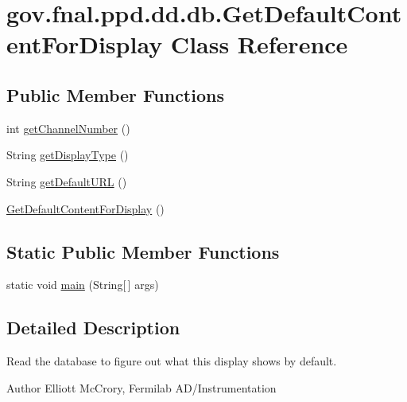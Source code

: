 \hypertarget{classgov_1_1fnal_1_1ppd_1_1dd_1_1db_1_1GetDefaultContentForDisplay}{\section{gov.\-fnal.\-ppd.\-dd.\-db.\-Get\-Default\-Content\-For\-Display Class Reference}
\label{classgov_1_1fnal_1_1ppd_1_1dd_1_1db_1_1GetDefaultContentForDisplay}
}
\subsection*{Public Member Functions}
\begin{DoxyCompactItemize}
\item 
int \hyperlink{classgov_1_1fnal_1_1ppd_1_1dd_1_1db_1_1GetDefaultContentForDisplay_a91c8a3eed831fa3bb4ad275d69b4ba02}{get\-Channel\-Number} ()
\item 
String \hyperlink{classgov_1_1fnal_1_1ppd_1_1dd_1_1db_1_1GetDefaultContentForDisplay_a4a29571d02723ece4c261d02f49c6624}{get\-Display\-Type} ()
\item 
String \hyperlink{classgov_1_1fnal_1_1ppd_1_1dd_1_1db_1_1GetDefaultContentForDisplay_a6bf210300f913dad893697e363b10943}{get\-Default\-U\-R\-L} ()
\item 
\hyperlink{classgov_1_1fnal_1_1ppd_1_1dd_1_1db_1_1GetDefaultContentForDisplay_ac29f1d17bc0b8de2def1a7dfb77ee9c9}{Get\-Default\-Content\-For\-Display} ()
\end{DoxyCompactItemize}
\subsection*{Static Public Member Functions}
\begin{DoxyCompactItemize}
\item 
static void \hyperlink{classgov_1_1fnal_1_1ppd_1_1dd_1_1db_1_1GetDefaultContentForDisplay_a016c5db98dc6eefab5561c34d8a5383d}{main} (String\mbox{[}$\,$\mbox{]} args)
\end{DoxyCompactItemize}


\subsection{Detailed Description}
Read the database to figure out what this display shows by default.

\begin{DoxyAuthor}{Author}
Elliott Mc\-Crory, Fermilab A\-D/\-Instrumentation 
\end{DoxyAuthor}


